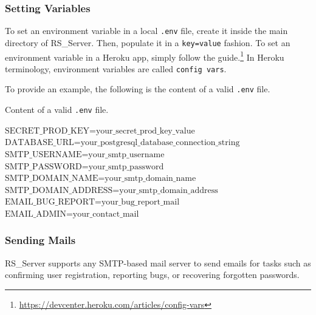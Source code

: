 \documentclass[a4paper, english]{article}
\newcommand{\rsserver}{RS\_Server\xspace}
\begin{document}
\subsubsection{Setting Variables}

\label{set-var}

To set an environment variable in a local \verb|.env| file, create it inside the main directory of \rsserver. Then, populate it in a \verb|key=value| fashion.
To set an environment variable in a Heroku app, simply follow the guide.\footnote{\url{https://devcenter.heroku.com/articles/config-vars}} In Heroku terminology, environment variables are called \verb|config vars|.

To provide an example, the following is the content of a valid \verb|.env| file.

\begin{algorithm}[h]
\caption{Content of a valid \texttt{.env} file.}
\label{env-file}
\begin{algorithmic}[1]
\State$\text{SECRET\_PROD\_KEY=your\_secret\_prod\_key\_value}$
\State$\text{DATABASE\_URL=your\_postgresql\_database\_connection\_string}$
\State$\text{SMTP\_USERNAME=your\_smtp\_username}$
\State$\text{SMTP\_PASSWORD=your\_smtp\_password}$
\State$\text{SMTP\_DOMAIN\_NAME=your\_smtp\_domain\_name}$
\State$\text{SMTP\_DOMAIN\_ADDRESS=your\_smtp\_domain\_address}$
\State$\text{EMAIL\_BUG\_REPORT=your\_bug\_report\_mail}$
\State$\text{EMAIL\_ADMIN=your\_contact\_mail}$
\end{algorithmic}
\end{algorithm}

\subsubsection{Sending Mails}

\rsserver supports any SMTP-based mail server to send emails for tasks such as confirming user registration, reporting bugs, or recovering forgotten passwords.
\end{document}
